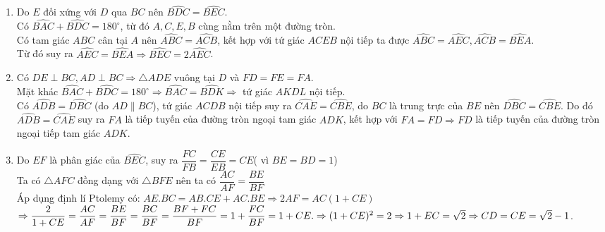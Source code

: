 \begin{ex}
{\begin{center}
		\end{center}
		\begin{enumerate}
			\item Do $E$ đối xứng với $D$ qua $BC$ nên $\widehat{BDC}=\widehat{BEC} $.\\
			Có $\widehat{BAC}+\widehat{BDC}=180^\circ $, từ đó $A,C,E,B$ cùng nằm trên một đường tròn.\\
			Có tam giác $ABC$ cân tại $A$ nên $\widehat{ABC}=\widehat{ACB} $, kết hợp với tứ giác $ACEB$ nội tiếp ta được $\widehat{ABC}=\widehat{AEC},\widehat{ACB}=\widehat{BEA}. $\\
			Từ đó suy ra $\widehat{AEC}=\widehat{BEA} \Rightarrow \widehat{BEC}=2\widehat{AEC} $.
			\item Có $DE \perp BC,AD\perp BC \Rightarrow \triangle ADE$ vuông tại $D$ và $FD=FE=FA$.\\
			Mặt khác $\widehat{BAC}+\widehat{BDC}=180^\circ\Rightarrow \widehat{BAC}=\widehat{BDK}\Rightarrow $ tứ giác $AKDL$ nội tiếp.\\
			Có $\widehat{ADB}=\widehat{DBC} $ (do $AD\parallel BC$), tứ giác $ACDB$ nội tiếp suy ra $\widehat{CAE}=\widehat{CBE}$, do $BC$ là trung trực của $BE$ nên $\widehat{DBC}=\widehat{CBE}$. Do đó $\widehat{ADB}=\widehat{CAE}$ suy ra $FA$ là tiếp tuyến của đường tròn ngoại tam giác $ADK$, kết hợp với $FA=FD\Rightarrow FD$ là tiếp tuyến của đường tròn ngoại tiếp tam giác $ADK$.
				\item  Do $EF$ là phân giác của $\widehat{BEC}$, suy ra $\dfrac{FC}{FB}=\dfrac{CE}{EB}=CE$( vì $BE=BD=1$)\\
				Ta có $\triangle AFC$ đồng dạng với $\triangle BFE$ nên ta có $\dfrac{AC}{AF}=\dfrac{BE}{BF}$\\
				Áp dụng định lí Ptolemy có: $AE.BC=AB.CE+AC.BE\Rightarrow 2AF=AC(1+CE)$\\
				$\Rightarrow\dfrac{2}{1+CE}=\dfrac{AC}{AF}=\dfrac{BE}{BF}=\dfrac{BC}{BF}=\dfrac{BF+FC}{BF}=1+\dfrac{FC}{BF}=1+CE.\\
				\Rightarrow (1+CE)^2=2\Rightarrow 1+EC=\sqrt{2}\\\Rightarrow CD=CE=\sqrt{2}-1$.
		\end{enumerate}
	}
\end{ex}

